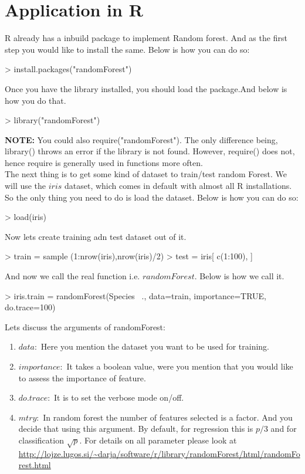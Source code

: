 \documentclass[journal]{IEEEtran}
\begin{document}
\section{Application in R}
R already has a inbuild package to implement Random forest. And as the first step you would like to install the same. Below is how you can do so:
\begin{Schunk}
\begin{Sinput}
> install.packages("randomForest")
\end{Sinput}
\end{Schunk}
Once you have the library installed, you should load the package.And below is how you do that.
\begin{Schunk} 
\begin{Sinput}
> library("randomForest")
\end{Sinput} 
\end{Schunk}
\textbf{NOTE:} You could also require("randomForest"). The only difference being, library() throws an error if the library is not found. However, require() does not, hence require is generally used in functions more often. \\
The next thing is to get some kind of dataset to train/test random Forest. We will use the $iris$ dataset, which comes in default with almost all R installations. So the only thing you need to do is load the dataset. Below is how you can do so:
\begin{Schunk} 
\begin{Sinput} 
> load(iris)  
\end{Sinput} 
\end{Schunk}
Now lets create training adn test dataset out of it.
\begin{Schunk} 
\begin{Sinput} 
> train = sample (1:nrow(iris),nrow(iris)/2)
> test = iris[ c(1:100), ]
\end{Sinput} 
\end{Schunk}
And now we call the real function i.e. $randomForest$. Below is how we call it.
\begin{Schunk} 
\begin{Sinput} 
> iris.train = randomForest(Species ~., data=train, 
importance=TRUE, do.trace=100)
\end{Sinput} 
\end{Schunk}
Lets discuss the arguments of randomForest:
\begin{enumerate}
	\item $data:$ Here you mention the dataset you want to be used for training.
	\item $importance:$ It takes a boolean value, were you mention that you would like to assess the importance of feature.
	\item $do.trace:$ It is to set the verbose mode on/off.
	\item $mtry:$ In random forest the number of features selected is a factor. And you decide that using this argument. By default, for regression this is $p/3$ and for classification $\sqrt{p}$.
For details on all parameter please look at \url{http://lojze.lugos.si/~darja/software/r/library/randomForest/html/randomForest.html}
\end{enumerate}
\end{document}
